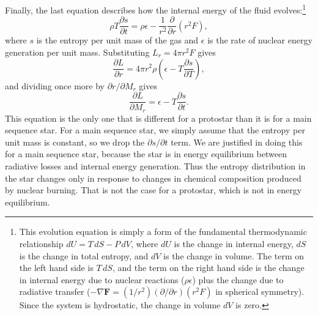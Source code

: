 Finally, the last equation describes how the internal energy of the fluid evolves:\footnote{This evolution equation is simply a form of the fundamental thermodynamic relationship $dU = T\, dS - P\, dV$, where $dU$ is the change in internal energy, $dS$ is the change in total entropy, and $dV$ is the change in volume. The term on the left hand side is $T \, dS$, and the term on the right hand side is the change in internal energy due to nuclear reactions ($\rho \epsilon$) plus the change due to radiative transfer ($-\nabla \mathbf{F} = (1/r^2) (\partial/\partial r)(r^2 F)$ in spherical symmetry). Since the system is hydrostatic, the change in volume $dV$ is zero.}
\begin{equation}
\rho T\frac{\partial s}{\partial t} = \rho \epsilon - \frac{1}{r^2}\frac{\partial}{\partial r}(r^2 F),
\end{equation}
where $s$ is the entropy per unit mass of the gas and $\epsilon$ is the rate of nuclear energy generation per unit mass. Substituting $L_r = 4 \pi r^2 F$ gives
\begin{equation}
\frac{\partial L}{\partial r} = 4\pi r^2 \rho \left(\epsilon - T\frac{\partial s}{\partial T}\right),
\end{equation}
and dividing once more by $\partial r/\partial M_r$ gives
\begin{equation}
\label{heat}
\frac{\partial L}{\partial M_r} = \epsilon - T\frac{\partial s}{\partial t}.
\end{equation}
This equation is the only one that is different for a protostar than it is for a main sequence star. For a main sequence star, we simply assume that the entropy per unit mass is constant, so we drop the $\partial s/\partial t$ term. We are justified in doing this for a main sequence star, because the star is in energy equilibrium between radiative losses and internal energy generation. Thus the entropy distribution in the star changes only in response to changes in chemical composition produced by nuclear burning. That is not the case for a protostar, which is not in energy equilibrium.

